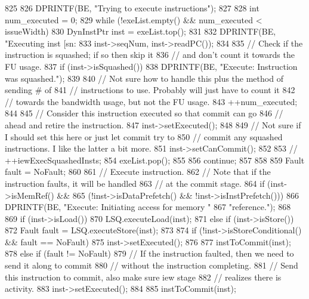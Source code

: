 \begin{DoxyCode}
825 {
826     DPRINTF(BE, "Trying to execute instructions\n");
827 
828     int num_executed = 0;
829     while (!exeList.empty() && num_executed < issueWidth) {
830         DynInstPtr inst = exeList.top();
831 
832         DPRINTF(BE, "Executing inst [sn:%
833                 inst->seqNum, inst->readPC());
834 
835         // Check if the instruction is squashed; if so then skip it
836         // and don't count it towards the FU usage.
837         if (inst->isSquashed()) {
838             DPRINTF(BE, "Execute: Instruction was squashed.\n");
839 
840             // Not sure how to handle this plus the method of sending # of
841             // instructions to use.  Probably will just have to count it
842             // towards the bandwidth usage, but not the FU usage.
843             ++num_executed;
844 
845             // Consider this instruction executed so that commit can go
846             // ahead and retire the instruction.
847             inst->setExecuted();
848 
849             // Not sure if I should set this here or just let commit try to
850             // commit any squashed instructions.  I like the latter a bit more.
851             inst->setCanCommit();
852 
853 //            ++iewExecSquashedInsts;
854             exeList.pop();
855 
856             continue;
857         }
858 
859         Fault fault = NoFault;
860 
861         // Execute instruction.
862         // Note that if the instruction faults, it will be handled
863         // at the commit stage.
864         if (inst->isMemRef() &&
865             (!inst->isDataPrefetch() && !inst->isInstPrefetch())) {
866             DPRINTF(BE, "Execute: Initiating access for memory "
867                     "reference.\n");
868 
869             if (inst->isLoad()) {
870                 LSQ.executeLoad(inst);
871             } else if (inst->isStore()) {
872                 Fault fault = LSQ.executeStore(inst);
873 
874                 if (!inst->isStoreConditional() && fault == NoFault) {
875                     inst->setExecuted();
876 
877                     instToCommit(inst);
878                 } else if (fault != NoFault) {
879                     // If the instruction faulted, then we need to send it along 
      to commit
880                     // without the instruction completing.
881                     // Send this instruction to commit, also make sure iew stage
882                     // realizes there is activity.
883                     inst->setExecuted();
884 
885                     instToCommit(inst);
}}}}}
\end{DoxyCode}
